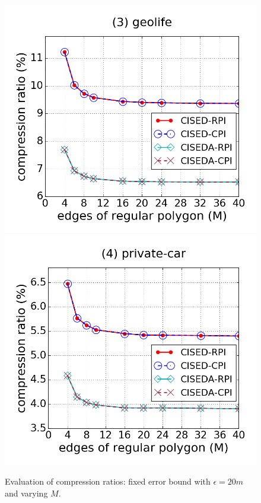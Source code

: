 \begin{figure}[tb!]
\includegraphics[scale = 0.245]{figures/Exp-M-e-20-CR-geolife.png}
\includegraphics[scale = 0.245]{figures/Exp-M-e-20-CR-private.png}
\vspace{-2ex}
\caption{\small Evaluation of compression ratios: fixed error bound with $\epsilon=20m$ and varying $M$.}
\label{fig:m-cr-e20}
\vspace{-1ex}
\end{figure}

